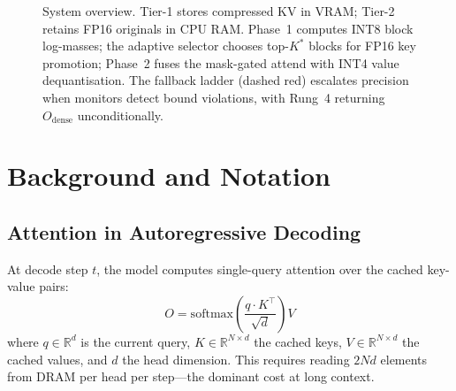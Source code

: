 \documentclass[10pt,twocolumn,a4paper]{article}
\theoremstyle{definition}
\theoremstyle{remark}
\newcommand{\R}{\mathbb{R}}
\begin{document}
\begin{figure}[!t]
{
}
\caption{System overview.  Tier-1 stores compressed KV in VRAM; Tier-2 retains FP16 originals in CPU RAM\@.  Phase~1 computes INT8 block log-masses; the adaptive selector chooses top-$K^*$ blocks for FP16 key promotion; Phase~2 fuses the mask-gated attend with INT4 value dequantisation.  The fallback ladder (dashed red) escalates precision when monitors detect bound violations, with Rung~4 returning $O_{\mathrm{dense}}$ unconditionally.}
\label{fig:overview}
\end{figure}

\section{Background and Notation}
\label{sec:background}

\subsection{Attention in Autoregressive Decoding}

At decode step $t$, the model computes single-query attention over the cached key-value pairs:
\begin{equation}
\label{eq:attention}
  O = \mathrm{softmax}\!\left(\frac{q \cdot K^\top}{\sqrt{d}}\right) V
\end{equation}
where $q \in \R^d$ is the current query, $K \in \R^{N \times d}$ the cached keys, $V \in \R^{N \times d}$ the cached values, and $d$ the head dimension.  This requires reading $2Nd$ elements from DRAM per head per step---the dominant cost at long context.
\end{document}
